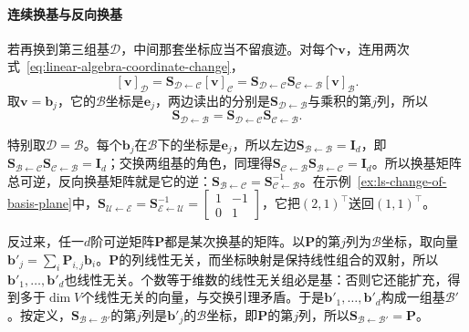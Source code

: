 \paragraph{连续换基与反向换基}
若再换到第三组基$\mathcal D$，中间那套坐标应当不留痕迹。对每个$\bm v$，连用两次式~\eqref{eq:linear-algebra-coordinate-change}，
\[
 [\bm v]_{\mathcal D}=\bm S_{\mathcal D\leftarrow\mathcal C}[\bm v]_{\mathcal C}=\bm S_{\mathcal D\leftarrow\mathcal C}\bm S_{\mathcal C\leftarrow\mathcal B}[\bm v]_{\mathcal B}.
\]
取$\bm v=\bm b_j$，它的$\mathcal B$坐标是$\bm e_j$，两边读出的分别是$\bm S_{\mathcal D\leftarrow\mathcal B}$与乘积的第$j$列，所以
\[
 \bm S_{\mathcal D\leftarrow\mathcal B}
 =\bm S_{\mathcal D\leftarrow\mathcal C}\bm S_{\mathcal C\leftarrow\mathcal B}.
\]

特别取$\mathcal D=\mathcal B$。每个$\bm b_j$在$\mathcal B$下的坐标是$\bm e_j$，所以左边$\bm S_{\mathcal B\leftarrow\mathcal B}=\bm I_d$，即$\bm S_{\mathcal B\leftarrow\mathcal C}\bm S_{\mathcal C\leftarrow\mathcal B}=\bm I_d$；交换两组基的角色，同理得$\bm S_{\mathcal C\leftarrow\mathcal B}\bm S_{\mathcal B\leftarrow\mathcal C}=\bm I_d$。所以换基矩阵总可逆，反向换基矩阵就是它的逆：$\bm S_{\mathcal B\leftarrow\mathcal C}=\bm S_{\mathcal C\leftarrow\mathcal B}^{-1}$。在示例~\ref{ex:ls-change-of-basis-plane}中，$\bm S_{\mathcal U\leftarrow\mathcal E}=\bm S_{\mathcal E\leftarrow\mathcal U}^{-1}=\left[\begin{smallmatrix}1&-1\\0&1\end{smallmatrix}\right]$，它把$(2,1)^{\top}$送回$(1,1)^{\top}$。

反过来，任一$d$阶可逆矩阵$\bm P$都是某次换基的矩阵。以$\bm P$的第$j$列为$\mathcal B$坐标，取向量$\bm b'_j=\sum_i\bm P_{i,j}\bm b_i$。$\bm P$的列线性无关，而坐标映射是保持线性组合的双射，所以$\bm b'_1,\ldots,\bm b'_d$也线性无关。个数等于维数的线性无关组必是基：否则它还能扩充，得到多于$\dim V$个线性无关的向量，与交换引理矛盾。于是$\bm b'_1,\ldots,\bm b'_d$构成一组基$\mathcal B'$。按定义，$\bm S_{\mathcal B\leftarrow\mathcal B'}$的第$j$列是$\bm b'_j$的$\mathcal B$坐标，即$\bm P$的第$j$列，所以$\bm S_{\mathcal B\leftarrow\mathcal B'}=\bm P$。

